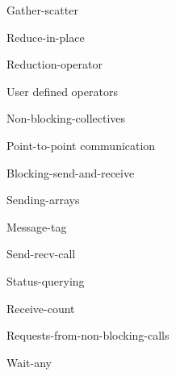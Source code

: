 \documentclass[11pt,headernav]{beamer}
\begin{document}
\begin{frame}[containsverbatim]{Gather-scatter}
  
\end{frame}
\begin{frame}[containsverbatim]{Reduce-in-place}
  \footnotesize
  
\end{frame}
\begin{frame}[containsverbatim]{Reduction-operator}
  
\end{frame}
\begin{frame}[containsverbatim]{User defined operators}
  
\end{frame}
\begin{frame}[containsverbatim]{Non-blocking-collectives}
  
\end{frame}

 {Point-to-point communication}

\begin{frame}[containsverbatim]{Blocking-send-and-receive}
  
\end{frame}
\begin{frame}[containsverbatim]{Sending-arrays}
  
\end{frame}
\begin{frame}[containsverbatim]{Message-tag}
  
\end{frame}
\begin{frame}[containsverbatim]{Send-recv-call}
  
\end{frame}
\begin{frame}[containsverbatim]{Status-querying}
  
\end{frame}

\begin{frame}[containsverbatim]{Receive-count}
  
\end{frame}

\begin{frame}[containsverbatim]{Requests-from-non-blocking-calls}
  
\end{frame}
\begin{frame}[containsverbatim]{Wait-any}
  
\end{frame}
\end{document}
